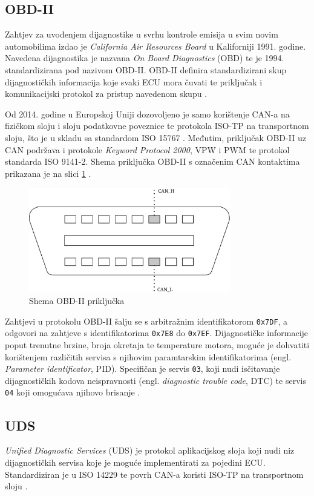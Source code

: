 \documentclass[times, utf8, diplomski, numeric]{fer}
\begin{document}
\subsection{OBD-II}
Zahtjev za uvođenjem dijagnostike u svrhu kontrole emisija u svim novim automobilima izdao je \textit{California Air Resources Board} u Kaliforniji 1991. godine. Navedena dijagnostika je nazvana \textit{On Board Diagnostics} (OBD) te je 1994. standardizirana pod nazivom OBD-II. OBD-II definira standardizirani skup dijagnostičkih informacija koje svaki ECU mora čuvati te priključak i komunikacijski protokol za pristup navedenom skupu \cite{bosch2022handbook}.

Od 2014. godine u Europskoj Uniji dozovoljeno je samo korištenje CAN-a na fizičkom sloju i sloju podatkovne poveznice te protokola ISO-TP na transportnom sloju, što je u skladu sa standardom ISO 15767 \cite{bosch2022handbook}. Međutim, priključak OBD-II uz CAN podržava i protokole \textit{Keyword Protocol 2000}, VPW i PWM te protokol standarda ISO 9141-2. Shema priključka OBD-II s označenim CAN kontaktima prikazana je na slici \ref{fig:obd2} \cite{falch2022obd}.

\begin{figure}[htb]
\centering
\includegraphics[width=250pt]{slike/obd2.png}
\caption{Shema OBD-II priključka}
\label{fig:obd2}
\end{figure}

Zahtjevi u protokolu OBD-II šalju se s arbitražnim identifikatorom \texttt{0x7DF}, a odgovori na zahtjeve s identifikatorima \texttt{0x7E8} do \texttt{0x7EF}. Dijagnostičke informacije poput trenutne brzine, broja okretaja te temperature motora, moguće je dohvatiti korištenjem različitih servisa s njihovim paramtarskim identifikatorima (engl. \textit{Parameter identificator}, PID). Specifičan je servis \texttt{03}, koji nudi isčitavanje dijagnostičkih kodova neispravnosti (engl. \textit{diagnostic trouble code}, DTC) te servis \texttt{04} koji omogućava njihovo brisanje \cite{falch2022xcp}.

\subsection{UDS}
\textit{Unified Diagnostic Services} (UDS) je protokol aplikacijskog sloja koji nudi niz dijagnostičkih servisa koje je moguće implementirati za pojedini ECU. Standardiziran je u ISO 14229 te povrh CAN-a koristi ISO-TP na transportnom sloju \cite{dissecto2023uds}.
\end{document}
